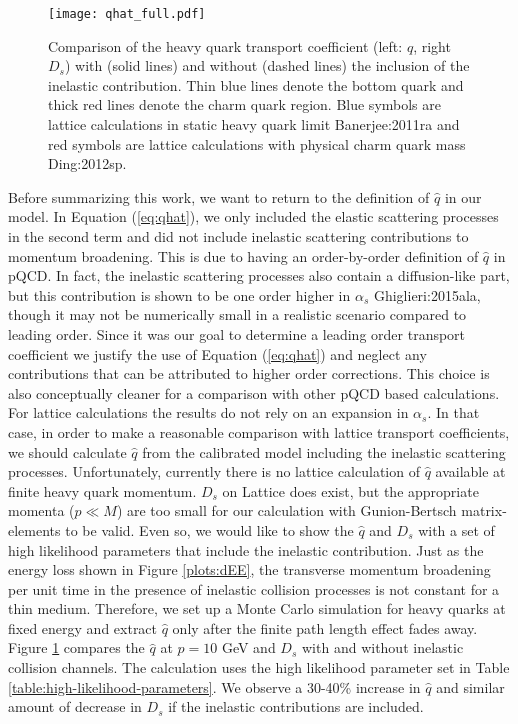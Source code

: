 \begin{figure}
\texttt{[image: qhat\_full.pdf]}
\caption{Comparison of the heavy quark transport coefficient (left: $\hat{q}$, right $D_s$) with (solid lines) and without (dashed lines) the inclusion of the inelastic contribution. Thin blue lines denote the bottom quark and thick red lines denote the charm quark region. Blue symbols are lattice calculations in static heavy quark limit {Banerjee:2011ra} and red symbols are lattice calculations with physical charm quark mass {Ding:2012sp}.}\label{plots:transport_full}
\end{figure}
Before summarizing this work, we want to return to the definition of $\hat{q}$ in our model.
In Equation (\ref{eq:qhat}), we  only included the elastic scattering processes in the second term and did not include inelastic scattering contributions to momentum broadening.
This is due to having an order-by-order definition of $\hat{q}$ in pQCD.
In fact, the inelastic scattering processes also contain a diffusion-like part, but this contribution is shown to be one order higher in $\alpha_s$ {Ghiglieri:2015ala}, though it may not be numerically small in a realistic scenario compared to leading order.
Since it was our goal to determine a leading order transport coefficient we justify the use of Equation (\ref{eq:qhat}) and neglect any contributions that can be attributed to higher order corrections. 
This choice is also conceptually cleaner for a comparison with other pQCD based calculations.
For lattice calculations the results do not rely on an expansion in $\alpha_s$.
In that case, in order to make a reasonable comparison with lattice transport coefficients, we should calculate $\hat{q}$ from the calibrated model including the inelastic scattering processes.
Unfortunately, currently there is no lattice calculation of $\hat{q}$ available at finite heavy quark momentum.  
$D_s$ on Lattice does exist, but the appropriate momenta ($p \ll M$) are too small for our calculation with Gunion-Bertsch matrix-elements to be valid.
Even so, we would like to show the $\hat{q}$ and $D_s$ with a set of high likelihood parameters that include the inelastic contribution.
Just as the energy loss shown in Figure \ref{plots:dEE}, the transverse momentum broadening per unit time in the presence of inelastic collision processes is not constant for a thin medium.
Therefore, we set up a Monte Carlo simulation for heavy quarks at fixed energy  and extract $\hat{q}$ only after the finite path length effect fades away. 
Figure \ref{plots:transport_full} compares the $\hat{q}$ at $p=10$ GeV and $D_s$ with and without inelastic collision channels.
The calculation uses the high likelihood parameter set in Table \ref{table:high-likelihood-parameters}. 
We observe a 30-40\% increase in $\hat{q}$ and similar amount of decrease in $D_s$ if the inelastic contributions are included.

